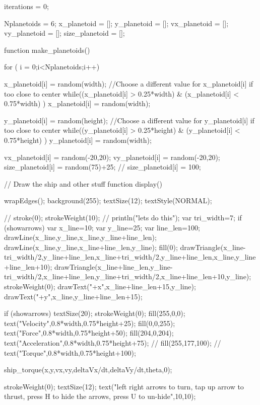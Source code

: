 \documentclass{ximera}
\begin{document}
\begin{javascriptCode}
iterations = 0;

Nplanetoids = 6;
x_planetoid = [];
y_planetoid = [];
vx_planetoid = [];
vy_planetoid = [];
size_planetoid = [];

function make_planetoids() {
  
  for ( i = 0;i<Nplanetoids;i++){

  x_planetoid[i] = random(width);
  //Choose a different value for x_planetoid[i] if too close to center
  while((x_planetoid[i] > 0.25*width) & (x_planetoid[i] < 0.75*width) ) {
  x_planetoid[i] = random(width);
  }  
  
  y_planetoid[i] = random(height);
  //Choose a different value for y_planetoid[i] if too close to center
  while((y_planetoid[i] > 0.25*height) & (y_planetoid[i] < 0.75*height) ) {
  y_planetoid[i] = random(width);
  }  

  vx_planetoid[i] = random(-20,20);
  vy_planetoid[i] = random(-20,20);
  size_planetoid[i] = random(75)+25;
//  size_planetoid[i] = 100;  
  }
}


// Draw the ship and other stuff
function display() {
    wrapEdges();
    background(255);
    textSize(12);
    textStyle(NORMAL);

//    stroke(0);
    strokeWeight(10);
//    println("lets do this");
    var tri_width=7;
    if (showarrows) {
            var x_line=10;
            var y_line=25;
            var line_len=100;
            drawLine(x_line,y_line,x_line,y_line+line_len);
            drawLine(x_line,y_line,x_line+line_len,y_line);
        fill(0);
        drawTriangle(x_line-tri_width/2,y_line+line_len,x_line+tri_width/2,y_line+line_len,x_line,y_line+line_len+10);
        drawTriangle(x_line+line_len,y_line-tri_width/2,x_line+line_len,y_line+tri_width/2,x_line+line_len+10,y_line);
            strokeWeight(0);
            drawText("+x",x_line+line_len+15,y_line);
            drawText("+y",x_line,y_line+line_len+15);
    }

    if (showarrows) {
    textSize(20);
    strokeWeight(0);
    fill(255,0,0);
    text("Velocity",0.8*width,0.75*height+25);
    fill(0,0,255);
    text("Force",0.8*width,0.75*height+50);
    fill(204,0,204);
    text("Acceleration",0.8*width,0.75*height+75);
//    fill(255,177,100);
//    text("Torque",0.8*width,0.75*height+100);  
    }

    ship_torque(x,y,vx,vy,deltaVx/dt,deltaVy/dt,theta,0);

    strokeWeight(0);
    textSize(12);
    text("left right arrows to turn, tap up arrow to thrust, press H to hide the arrows, press U to un-hide",10,10);

}
\end{javascriptCode}
\end{document}
